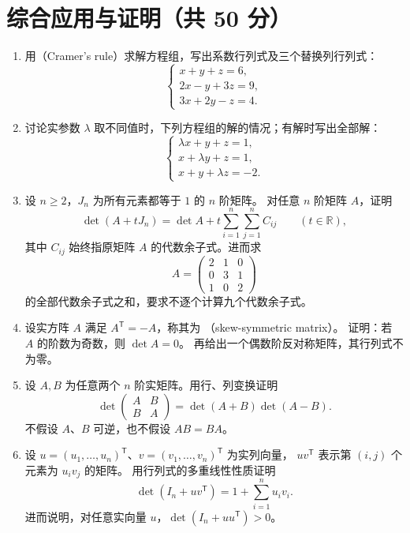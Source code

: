 \documentclass[UTF8,12pt,a4paper,fontset=fandol]{ctexart}
\begin{document}
\section{综合应用与证明（共 50 分）}
\begin{enumerate}[label=\arabic*.,resume=detquestions]

\item\label{q:cramer}
用（Cramer's rule）求解方程组，写出系数行列式及三个替换列行列式：
\[
\begin{cases}
x+y+z=6,\\
2x-y+3z=9,\\
3x+2y-z=4.
\end{cases}
\]

\item\label{q:parameter-system}
讨论实参数 $\lambda$ 取不同值时，下列方程组的解的情况；有解时写出全部解：
\[
\begin{cases}
\lambda x+y+z=1,\\
x+\lambda y+z=1,\\
x+y+\lambda z=-2.
\end{cases}
\]

\item\label{q:all-cofactors}
设 $n\geq2$，$J_n$ 为所有元素都等于 $1$ 的 $n$ 阶矩阵。
对任意 $n$ 阶矩阵 $A$，证明
\[
\det(A+tJ_n)=\det A+t\sum_{i=1}^n\sum_{j=1}^n C_{ij}
\qquad(t\in\mathbb R),
\]
其中 $C_{ij}$ 始终指原矩阵 $A$ 的代数余子式。进而求
\[
A=\begin{pmatrix}2&1&0\\0&3&1\\1&0&2\end{pmatrix}
\]
的全部代数余子式之和，要求不逐个计算九个代数余子式。

\item\label{q:skew-symmetric}
设实方阵 $A$ 满足 $A^{\mathsf T}=-A$，称其为
（skew-symmetric matrix）。
证明：若 $A$ 的阶数为奇数，则 $\det A=0$。
再给出一个偶数阶反对称矩阵，其行列式不为零。

\item\label{q:block-determinant}
设 $A,B$ 为任意两个 $n$ 阶实矩阵。用行、列变换证明
\[
\det\begin{pmatrix}A&B\\B&A\end{pmatrix}
=\det(A+B)\det(A-B).
\]
不假设 $A$、$B$ 可逆，也不假设 $AB=BA$。

\item\label{q:rank-one}
设 $u=(u_1,\ldots,u_n)^{\mathsf T}$、$v=(v_1,\ldots,v_n)^{\mathsf T}$ 为实列向量，
$uv^{\mathsf T}$ 表示第 $(i,j)$ 个元素为 $u_iv_j$ 的矩阵。
用行列式的多重线性性质证明
\[
\det(I_n+uv^{\mathsf T})=1+\sum_{i=1}^n u_iv_i.
\]
进而说明，对任意实向量 $u$，$\det(I_n+uu^{\mathsf T})>0$。


\end{enumerate}
\end{document}
